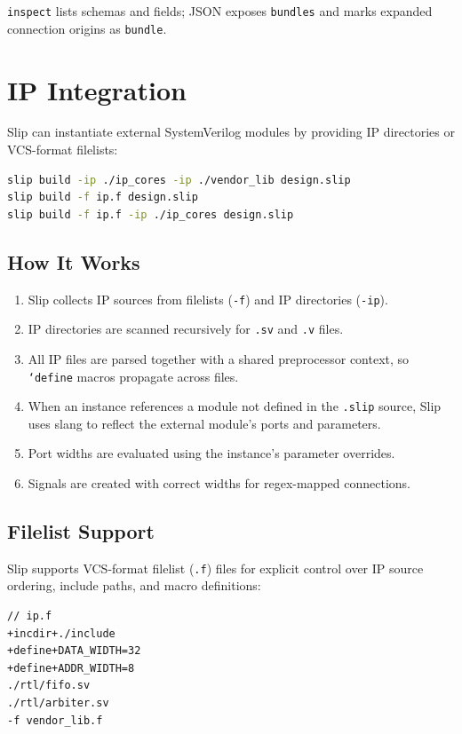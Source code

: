\documentclass[lang=en,11pt]{elegantbook}
\newcommand{\code}[1]{\texttt{#1}}
\begin{document}
\code{inspect} lists schemas and fields; JSON exposes \code{bundles} and marks
expanded connection origins as \code{bundle}.

\chapter{IP Integration}

Slip can instantiate external SystemVerilog modules by providing IP directories or VCS-format filelists:

\begin{lstlisting}[language=bash]
slip build -ip ./ip_cores -ip ./vendor_lib design.slip
slip build -f ip.f design.slip
slip build -f ip.f -ip ./ip_cores design.slip
\end{lstlisting}

\section{How It Works}

\begin{enumerate}
  \item Slip collects IP sources from filelists (\code{-f}) and IP directories (\code{-ip}).
  \item IP directories are scanned recursively for \code{.sv} and \code{.v} files.
  \item All IP files are parsed together with a shared preprocessor context, so \code{`define} macros propagate across files.
  \item When an instance references a module not defined in the \code{.slip} source, Slip uses slang to reflect the external module's ports and parameters.
  \item Port widths are evaluated using the instance's parameter overrides.
  \item Signals are created with correct widths for regex-mapped connections.
\end{enumerate}

\section{Filelist Support}

Slip supports VCS-format filelist (\code{.f}) files for explicit control over IP source ordering, include paths, and macro definitions:

\begin{lstlisting}[language=Slip]
// ip.f
+incdir+./include
+define+DATA_WIDTH=32
+define+ADDR_WIDTH=8
./rtl/fifo.sv
./rtl/arbiter.sv
-f vendor_lib.f
\end{lstlisting}
\end{document}
